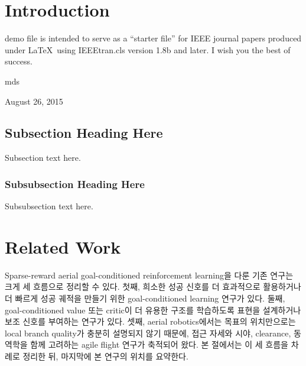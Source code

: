 \documentclass[journal]{IEEEtran}
\begin{document}
\section{Introduction}
% 
% 
% 
% 
 demo file is intended to serve as a ``starter file''
for IEEE journal papers produced under \LaTeX\ using
IEEEtran.cls version 1.8b and later.
I wish you the best of success.

\hfill mds
 
\hfill August 26, 2015

\subsection{Subsection Heading Here}
Subsection text here.


\subsubsection{Subsubsection Heading Here}
Subsubsection text here.

\section{Related Work}
\label{sec:related_work}
Sparse-reward aerial goal-conditioned reinforcement learning을 다룬 기존 연구는 크게 세 흐름으로 정리할 수 있다. 첫째, 희소한 성공 신호를 더 효과적으로 활용하거나 더 빠르게 성공 궤적을 만들기 위한 goal-conditioned learning 연구가 있다. 둘째, goal-conditioned value 또는 critic이 더 유용한 구조를 학습하도록 표현을 설계하거나 보조 신호를 부여하는 연구가 있다. 셋째, aerial robotics에서는 목표의 위치만으로는 local branch quality가 충분히 설명되지 않기 때문에, 접근 자세와 시야, clearance, 동역학을 함께 고려하는 agile flight 연구가 축적되어 왔다. 본 절에서는 이 세 흐름을 차례로 정리한 뒤, 마지막에 본 연구의 위치를 요약한다.
\end{document}
